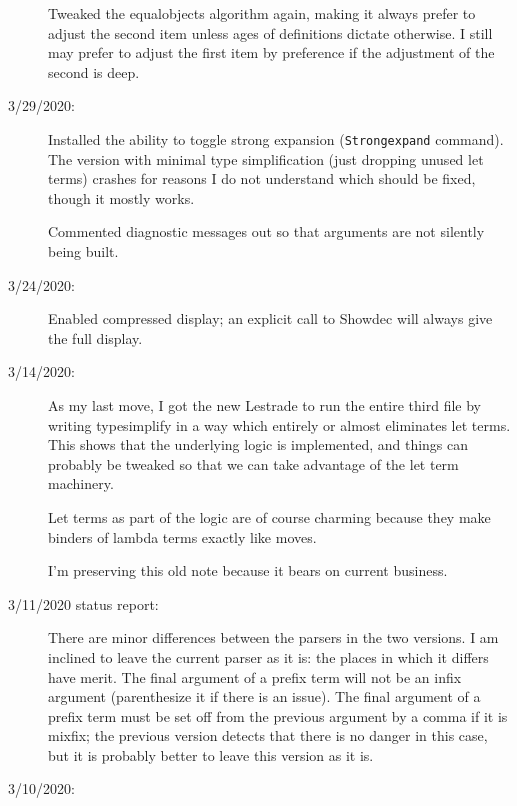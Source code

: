 \documentclass[12pt]{article}
\begin{document}
\begin{description}
Tweaked the equalobjects algorithm again, making it always prefer to adjust the second item unless
ages of definitions dictate otherwise.  I still may prefer to adjust the first item by preference if
the adjustment of the second is deep.

\item[3/29/2020:]  Installed the ability to toggle strong expansion ({\tt Strongexpand} command).  The version with minimal
type simplification (just dropping unused let terms) crashes for reasons I do not understand which should be
fixed, though it mostly works.

Commented diagnostic messages out so that arguments are not silently being built.





\item[3/24/2020:] 

Enabled compressed display;  an explicit call to Showdec will always give the full display.

\item[3/14/2020:] 

As my last move, I got the new Lestrade to run the entire third file by writing typesimplify in a way
which entirely or almost eliminates let terms.  This shows that the underlying logic is implemented, and things
can probably be tweaked so that we can take advantage of the let term machinery.

Let terms as part of the logic are of course charming because they make binders of lambda terms
exactly like moves.

I'm preserving this old note because it bears on current business.



\item[3/11/2020 status report:]

There are minor differences between the parsers in the two versions.  I am inclined to leave the current parser as it is:  the places in which it differs have merit.  The final argument of a prefix term will not be an infix argument (parenthesize it if there is an issue).  The final argument of a prefix term must be set off
from the previous argument by a comma if it is mixfix;  the previous version detects that there is no danger in this case, but it is probably better to leave this version as it is.




\item[3/10/2020:] 


\end{description}
\end{document}
